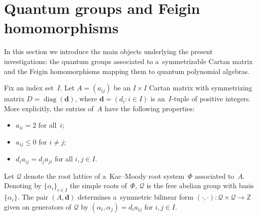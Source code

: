 \section{Quantum groups and Feigin homomorphisms}\label{sec:feigin}

In this section we introduce the main objects underlying the present investigations: the quantum groups associated to
a~symmetrizable Cartan matrix and the Feigin homomorphisms mapping them to quantum polynomial algebras.

Fix an index set~$I$.
Let $A=(a_{ij})$ be an $I\times I$ Cartan matrix with symmetrizing matrix $D=\operatorname{diag}(\mathbf{d})$, where
$\mathbf{d}=(d_i: i\in I)$ is an~$I$-tuple of positive integers.
More explicitly, the entries of~$A$ have the following properties:
\begin{itemize}\itemsep=0pt
\item $a_{ii}=2$ for all~$i$;
\item $a_{ij}\le0$ for $i\ne j$;
\item $d_ia_{ij}=d_ja_{ji}$ for all $i,j\in I$.
\end{itemize}
Let $\mathcal{Q}$ denote the root lattice of a~Kac--Moody root system~$\Phi$ associated to~$A$.
Denoting by $\{\alpha_i\}_{i\in I}$ the simple roots of~$\Phi$, $\mathcal{Q}$ is the free abelian %
group with basis $\{\alpha_i\}$.
The pair $(A,\mathbf{d})$ determines a~symmetric bilinear form $(\cdot,\cdot):\mathcal{Q}\times\mathcal{Q}\to\mathbb{Z}$
given on generators of $\mathcal{Q}$ by $(\alpha_i,\alpha_j)=d_ia_{ij}$ for $i,j\in I$.
